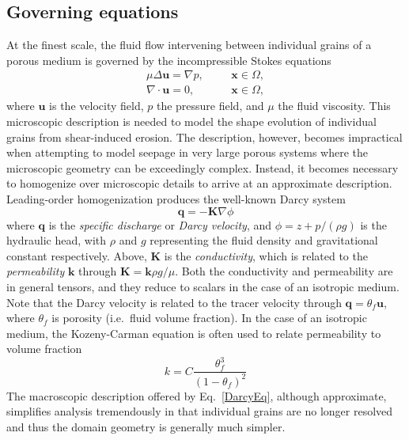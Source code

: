 \documentclass[12pt]{article}
\newcommand{\bvec}[1]{{\mathbf{#1}}}
\newcommand{\grad}{\nabla}
\newcommand{\uu}{\bvec{u}}
\newcommand{\xx}{\bvec{x}}
\newcommand {\qq} {\bvec{q}}
\begin{document}
\subsection{Governing equations}
At the finest scale, the fluid flow intervening between individual grains of a porous medium is governed by the incompressible Stokes equations
\begin{equation}
\label{StokesEq}
\begin{split}
\mu \Delta \uu = \grad p,	&\hspace{20pt} \xx \in \Omega, \\
\grad \cdot \uu = 0, 		&\hspace{20pt} \xx \in \Omega,
\end{split}
\end{equation}
where $\uu$ is the velocity field, $p$ the pressure field, and $\mu$ the fluid viscosity. This microscopic description is needed to model the shape evolution of individual grains from shear-induced erosion. The description, however, becomes impractical when attempting to model seepage in very large porous systems where the microscopic geometry can be exceedingly complex. Instead, it becomes necessary to homogenize over microscopic details to arrive at an approximate description. Leading-order homogenization produces the well-known Darcy system
\begin{equation}
\label{DarcyEq}
\qq = - \bvec{K} \grad \phi
\end{equation}
where $\qq$ is the {\em specific discharge} or {\em Darcy velocity}, and $\phi = z + p/(\rho g)$ is the hydraulic head, with $\rho$ and $g$ representing the fluid density and gravitational constant respectively. Above, $\bvec{K}$ is the {\em conductivity}, which is related to the {\em permeability} $\bvec{k}$ through $\bvec{K} = \bvec{k} \rho g/\mu$. Both the conductivity and permeability are in general tensors, and they reduce to scalars in the case of an isotropic medium.
Note that the Darcy velocity is related to the tracer velocity through $\qq = \theta_f \uu$, where $\theta_f$ is porosity (i.e.~fluid volume fraction).
In the case of an isotropic medium, the Kozeny-Carman equation is often used to relate permeability to volume fraction \cite{bear2013dynamics}
\begin{equation}
k = C \frac{\theta_f^3}{(1-\theta_f)^2}
\end{equation}
The macroscopic description offered by Eq.~\eqref{DarcyEq}, although approximate, simplifies analysis tremendously in that individual grains are no longer resolved and thus the domain geometry is generally much simpler.
\end{document}
